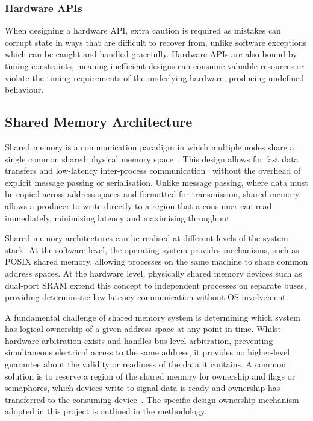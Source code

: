 \documentclass[final]{cmpreport}
\begin{document}
\subsubsection{Hardware APIs}
When designing a hardware API, extra caution is required as mistakes can corrupt state in ways that are difficult to recover from, unlike software exceptions which can be caught and handled gracefully. Hardware APIs are also bound by timing constraints, meaning inefficient designs can consume valuable resources or violate the timing requirements of the underlying hardware, producing undefined behaviour. 

\subsection{Shared Memory Architecture}
Shared memory is a communication paradigm in which multiple nodes share a single common shared physical memory space~\cite{hennessyComputerArchitectureQuantitative2012}. This design allows for fast data transfers and low-latency inter-process communication~\cite{tanenbaumInterprocessCommunication2015a} without the overhead of explicit message passing or serialisation. Unlike message passing, where data must be copied across address spaces and formatted for transmission, shared memory allows a producer to write directly to a region that a consumer can read immediately, minimising latency and maximising throughput.

Shared memory architectures can be realised at different levels of the system stack. At the software level, the operating system provides mechanisms, such as POSIX shared memory, allowing processes on the same machine to share common address spaces. At the hardware level, physically shared memory devices such as dual-port SRAM extend this concept to independent processes on separate buses, providing deterministic low-latency communication without OS involvement.

A fundamental challenge of shared memory system is determining which system has logical ownership of a given address space at any point in time. Whilst hardware arbitration exists and handles bus level arbitration, preventing simultaneous electrical access to the same address, it provides no higher-level guarantee about the validity or readiness of the data it contains. A common solution is to reserve a region of the shared memory for ownership and flags or semaphores, which devices write to signal data is ready and ownership has transferred to the consuming device~\cite{tanenbaumInterprocessCommunication2015b}. The specific design ownership mechanism adopted in this project is outlined in the methodology.
\end{document}
